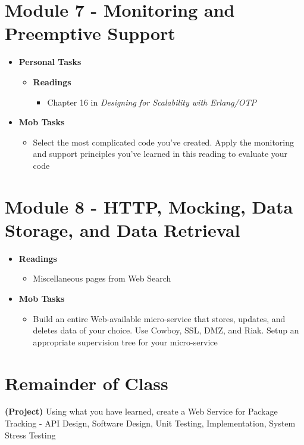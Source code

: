 \documentclass[12pt]{amsart}
\begin{document}
	\section*{Module 7 - Monitoring and Preemptive Support}
	 \begin{itemize}
		\item\textbf{ Personal Tasks} 
            	\begin{itemize}
            		\item \textbf{Readings}
            		\begin{itemize}
            			\item Chapter 16 in \textit{Designing for Scalability with Erlang/OTP}
            		\end{itemize}
            	\end{itemize}
		\item \textbf{Mob Tasks}
		\begin{itemize}
		\item Select the most complicated code you've created. Apply the monitoring and support principles you've learned in this reading to evaluate your code
		\end{itemize}
	\end{itemize}
	\section*{Module 8 - HTTP, Mocking, Data Storage, and Data Retrieval}  
	\begin{itemize}
		\item \textbf{Readings}
		\begin{itemize}
			\item Miscellaneous pages from Web Search
		\end{itemize}
	\end{itemize}
	\begin{itemize}
		\item \textbf{Mob Tasks}
		\begin{itemize}
		\item Build an entire Web-available micro-service that stores, updates, and deletes data of your choice. Use Cowboy, SSL, DMZ, and Riak. Setup an appropriate supervision tree for your micro-service
		\end{itemize}
	\end{itemize}

	\section*{Remainder of Class} \textbf{(Project)} Using what you have learned, create a Web Service for Package Tracking - API Design, Software Design, Unit Testing, Implementation, System Stress Testing
\end{document}
